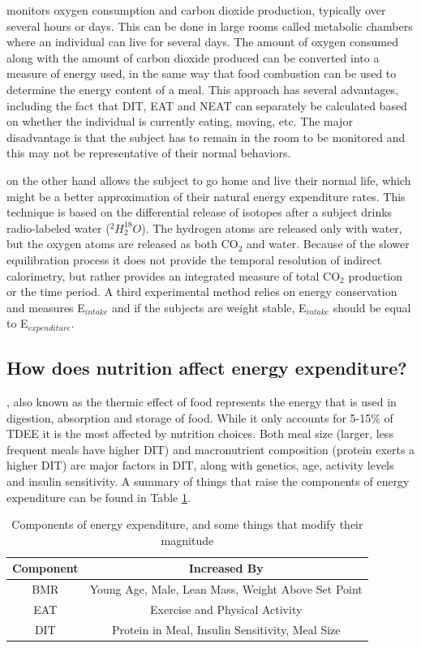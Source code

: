 \documentclass{tufte-handout}
\begin{document}
 monitors oxygen consumption and carbon dioxide production, typically over several hours or days.  This can be done in large rooms called metabolic chambers where an individual can live for several days.  The amount of oxygen consumed along with the amount of carbon dioxide produced can be converted into a measure of energy used, in the same way that food combustion can be used to determine the energy content of a meal.  This approach has several advantages, including the fact that DIT, EAT and NEAT can separately be calculated based on whether the individual is currently eating, moving, etc.  The major disadvantage is that the subject has to remain in the room to be monitored and this may not be representative of their normal behaviors.

 on the other hand allows the subject to go home and live their normal life, which might be a better approximation of their natural energy expenditure rates.  This technique is based on the differential release of isotopes after a subject drinks radio-labeled water ($^2H_2^{18}O$).  The hydrogen atoms are released only with water, but the oxygen atoms are released as both CO$_2$ and water.  Because of the slower equilibration process it does not provide the temporal resolution of indirect calorimetry, but rather provides an integrated measure of total CO$_2$ production or the time period.  A third experimental method relies on energy conservation and measures E$_{intake}$ and if the subjects are weight stable, E$_{intake}$ should be equal to E$_{expenditure}$. 

\subsection{How does nutrition affect energy expenditure?} 

, also known as the thermic effect of food represents the energy that is used in digestion, absorption and storage of food.  While it only accounts for 5-15\% of TDEE it is the most affected by nutrition choices.  Both meal size (larger, less frequent meals have higher DIT) and macronutrient composition (protein exerts a higher DIT) are major factors in DIT, along with genetics, age, activity levels and insulin sensitivity.  A summary of things that raise the components of energy expenditure can be found in Table \ref{tab:ee-components}.


\begin{table}
\centering
\caption{Components of energy expenditure, and some things that modify their magnitude}
\label{tab:ee-components}
\begin{tabular}{cc}
\hline
\textbf{Component}       & \textbf{Increased By}                     \\
\hline
BMR & Young Age, Male, Lean Mass, Weight Above Set Point\\
EAT & Exercise and Physical Activity\\
DIT & Protein in Meal, Insulin Sensitivity, Meal Size\\
\hline
\end{tabular}
\end{table}
\end{document}
